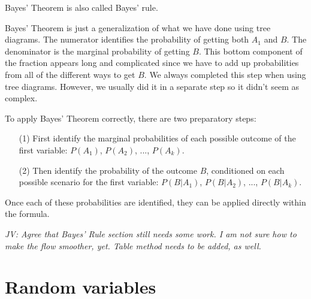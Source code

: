 \begin{doublespace}
Bayes' Theorem is also called Bayes' rule.

Bayes' Theorem is just a generalization of what we have done using tree diagrams. The numerator identifies the probability of getting both $A_1$ and $B$. The denominator is the marginal probability of getting $B$. This bottom component of the fraction appears long and complicated since we have to add up probabilities from all of the different ways to get $B$. We always completed this step when using tree diagrams. However, we usually did it in a separate step so it didn't seem as complex.

To apply Bayes' Theorem correctly, there are two preparatory steps:
\begin{enumerate}
\setlength{\itemsep}{0mm}
\item[(1)] First identify the marginal probabilities of each possible outcome of the first variable: $P(A_1)$, $P(A_2)$, ..., $P(A_k)$.
\item[(2)] Then identify the probability of the outcome $B$, conditioned on each possible scenario for the first variable: $P(B | A_1)$, $P(B | A_2)$, ..., $P(B | A_k)$.
\end{enumerate}
Once each of these probabilities are identified, they can be applied directly within the formula.

\textit{JV: Agree that Bayes' Rule section still needs some work. I am not sure how to make the flow smoother, yet. Table method needs to be added, as well.}

%





\textC{\newpage}



\section{Random variables}
\label{randomVariablesSection}



\end{doublespace}
